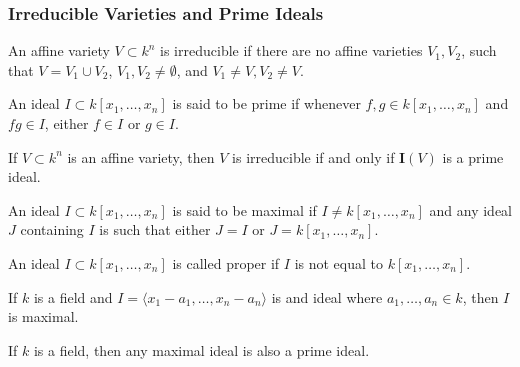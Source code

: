 \documentclass[crop=false,class=book,oneside]{standalone}
\begin{document}
            \subsubsection{Irreducible Varieties and Prime Ideals}
                \begin{definition}
                    An affine variety $V\subset k^n$ is irreducible
                    if there are no affine varieties $V_1, V_2$,
                    such that $V = V_1\cup V_2$, $V_1,V_2\ne \emptyset$,
                    and $V_1 \ne V, V_2 \ne V$.
                \end{definition}
                \begin{definition}
                    An ideal $I\subset k[x_1,\hdots ,x_n]$ is
                    said to be prime if whenever
                    $f,g\in k[x_1,\hdots ,x_n]$ and $fg\in I$,
                    either $f\in I$ or $g\in I$.
                \end{definition}
                \begin{theorem}
                    If $V\subset k^n$ is an affine variety,
                    then $V$ is irreducible if and only if
                    $\textbf{I}(V)$ is a prime ideal.
                \end{theorem}
                \begin{definition}
                    An ideal $I\subset k[x_1,\hdots ,x_n]$ is
                    said to be maximal if $I \ne k[x_1,\hdots ,x_n]$
                    and any ideal $J$ containing $I$ is such that
                    either $J=I$ or $J=k[x_1,\hdots ,x_n]$.
                \end{definition}
                \begin{definition}
                    An ideal $I\subset k[x_1,\hdots,x_n]$
                    is called proper if $I$ is not equal to
                    $k[x_1,\hdots ,x_n]$.
                \end{definition}
                \begin{theorem}
                    If $k$ is a field and
                    $I=\langle x_1-a_1,\hdots,x_n-a_n\rangle$
                    is and ideal where $a_1,\hdots, a_n \in k$,
                    then $I$ is maximal.
                \end{theorem}
                \begin{theorem}
                    If $k$ is a field, then any maximal
                    ideal is also a prime ideal.
                \end{theorem}
\end{document}
